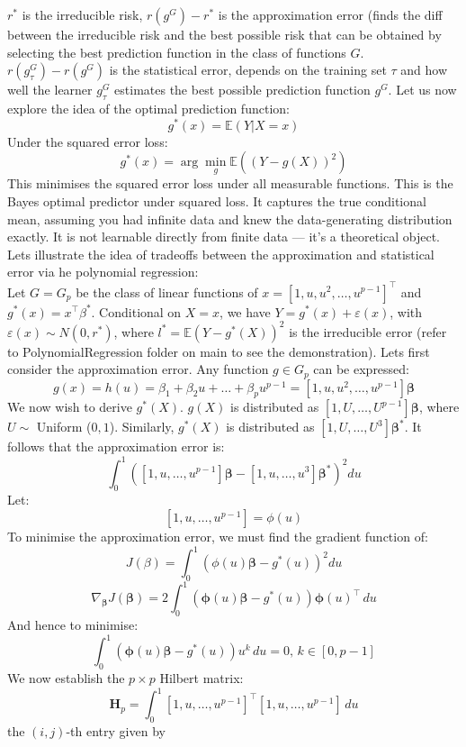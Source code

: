 \documentclass[12pt]{article}
\begin{document}
$r^* $ is the irreducible risk, $r(g^G)-r^*$ is the approximation error (finds the diff between the irreducible risk and the best possible risk that can be obtained by selecting the best prediction function in the class of functions $G$. $r(g^G_\tau)-r(g^G)$ is the statistical error, depends on the training set $\tau$ and how well the learner $g_\tau ^G$ estimates the best possible prediction function $g^G$. Let us now explore the idea of the optimal prediction function:
\[g^*(x) = \mathbb{E}(Y|X = x)\]
Under the squared error loss:
\[g^*(x) = \arg \min_{g}\mathbb{E}((Y-g(X))^2)\]
This minimises the squared error loss under all measurable functions. This is the Bayes optimal predictor under squared loss. It captures the true conditional mean, assuming you had infinite data and knew the data-generating distribution exactly.
It is not learnable directly from finite data — it's a theoretical object. Lets illustrate the idea of tradeoffs between the approximation and statistical error via he polynomial regression:
\\
Let $G = G_p$ be the class of linear functions of $x = [1, u, u^2, \dots, u^{p-1}]^\top$ and $g^*(x) = x^\top \beta^*$. Conditional on $X = x$, we have $Y = g^*(x) + \varepsilon(x)$, with $\varepsilon(x) \sim N(0,r^*)$, where $l^* = \mathbb{E}(Y-g^*(X))^2$ is the irreducible error (refer to PolynomialRegression folder on main to see the demonstration). Lets first consider the approximation error. Any function $g \in G_p$ can be expressed:
\[g(x) = h(u) = \beta_1 + \beta_2u + \dots + \beta_p u^{p-1} = [1, u, u^2, \dots, u^{p-1}]\boldsymbol{\beta}\]
We now wish to derive $g^*(X)$. $g(X)$ is distributed as $[1,U, \dots, U^{p-1}]\boldsymbol{\beta}$, where $U \sim $ Uniform ($0,1$). Similarly, $g^*(X)$ is distributed as $[1,U, \dots, U^{3}]\boldsymbol{\beta}^*$. It follows that the approximation error is:
\[\int_0^1 ([1, u, \dots, u^{p-1}]\boldsymbol{\beta} - [1,u,\dots, u^3]\boldsymbol{\beta ^*})^2 du\]
Let:
\[[1, u, \dots, u^{p-1}] = \phi(u)\]
To minimise the approximation error, we must find the gradient function of:
\[J(\beta) = \int_0^1 ( \phi(u)\boldsymbol{\beta} - g^*(u))^2 du\]
\[\nabla_{\boldsymbol{\beta}} J(\boldsymbol{\beta}) = 2 \int_0^1 \left( \boldsymbol{\phi}(u)\boldsymbol{\beta} - g^*(u) \right) \boldsymbol{\phi}(u)^\top \, du\]
And hence to minimise:
\[\int_0^1 \left( \boldsymbol{\phi}(u)\boldsymbol{\beta} - g^*(u) \right)  u^k \, du = 0, \, k \in [0, p-1]\]
We now establish the $p \times p$ Hilbert matrix:
\[
\mathbf{H}_p = \int_0^1 [1, u, \dots, u^{p-1}]^\top [1, u, \dots, u^{p-1}] \, du
\]
the \((i,j)\)-th entry given by
\end{document}

